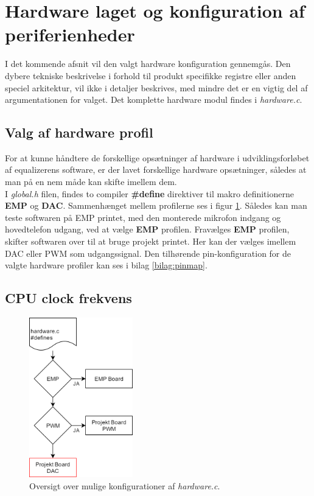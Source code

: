 \section{Hardware laget og konfiguration af periferienheder}
I det kommende afsnit vil den valgt hardware konfiguration gennemgås. 
Den dybere tekniske beskrivelse i forhold til produkt specifikke registre eller anden speciel arkitektur, vil ikke i detaljer beskrives, med mindre det er en vigtig del af argumentationen for valget.
Det komplette hardware modul findes i \emph{hardware.c}.

\subsection{Valg af hardware profil}
For at kunne håndtere de forskellige opsætninger af hardware i udviklingsforløbet af equalizerens software, er der lavet forskellige hardware opsætninger, således at man på en nem måde kan skifte imellem dem.
\\
I \textit{global.h} filen, findes to compiler \textbf{\#define} direktiver til makro definitionerne \textbf{EMP} og \textbf{DAC}.
Sammenhænget mellem profilerne ses i figur \ref{fig:hardware_profiler}. 
Således kan man teste softwaren på EMP printet, med den monterede mikrofon indgang og hovedtelefon udgang, ved at vælge \textbf{EMP} profilen.
Fravælges \textbf{EMP} profilen, skifter softwaren over til at bruge projekt printet.
Her kan der vælges imellem DAC eller PWM som udgangssignal.  
Den tilhørende pin-konfiguration for de valgte hardware profiler kan ses i bilag \ref{bilag:pinmap}.

\subsection{CPU clock frekvens}
\begin{figure}
	\centering
	\includegraphics[width=4.5cm]{billeder/hardware_profiles.png}
	\caption{Oversigt over mulige konfigurationer af \textit{hardware.c}.}
	\label{fig:hardware_profiler}
\end{figure}

